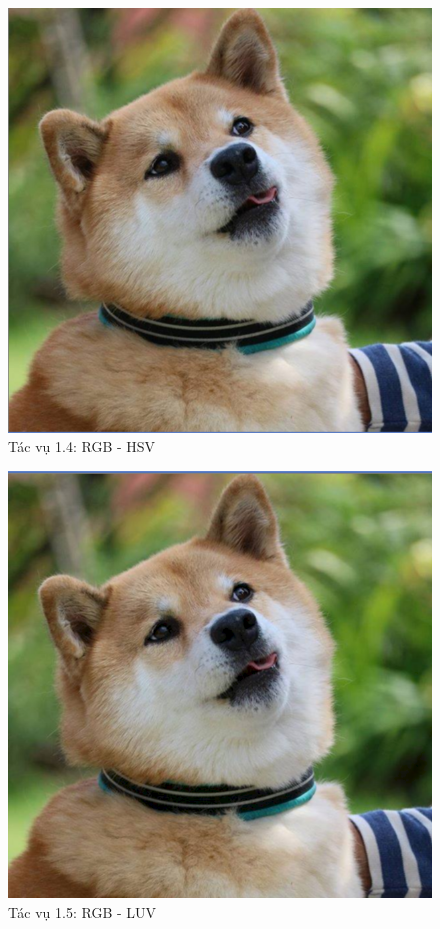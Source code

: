 \documentclass{article}
\begin{document}
		\begin{figure}[H]
			\centering
		\end{figure}
		\begin{figure}[H]
			\centering
			\includegraphics[scale = 0.4]{14}
			\caption{Tác vụ 1.4: RGB - HSV}
		\end{figure}
		\begin{figure}[H]
			\centering
			\includegraphics[scale = 0.4]{15luv}
			\caption{Tác vụ 1.5: RGB - LUV}
		\end{figure}
\end{document}
